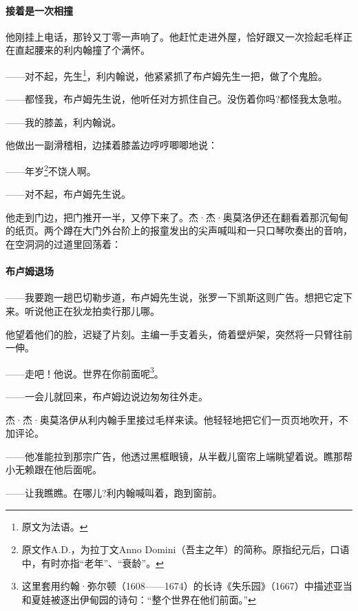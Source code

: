 \paragraph*{接着是一次相撞}
\par 他刚挂上电话，那铃又丁零一声响了。他赶忙走进外屋，恰好跟又一次捡起毛样正在直起腰来的利内翰撞了个满怀。
\par ——对不起，先生\footnote{原文为法语。}，利内翰说，他紧紧抓了布卢姆先生一把，做了个鬼脸。
\par ——都怪我，布卢姆先生说，他听任对方抓住自己。没伤着你吗?都怪我太急啦。
\par ——我的膝盖，利内翰说。
\par 他做出一副滑稽相，边揉着膝盖边哼哼唧唧地说：
\par ——年岁\footnote{原文作A.D.，为拉丁文Anno Domini（吾主之年）的简称。原指纪元后，口语中，有时亦指“老年”、“衰龄”。}不饶人啊。
\par ——对不起，布卢姆先生说。
\par 他走到门边，把门推开一半，又停下来了。杰·杰·奥莫洛伊还在翻看着那沉甸甸的纸页。两个蹲在大门外台阶上的报童发出的尖声喊叫和一只口琴吹奏出的音响，在空洞洞的过道里回荡着：

\paragraph*{布卢姆退场}
\par ——我要跑一趟巴切勒步道，布卢姆先生说，张罗一下凯斯这则广告。想把它定下来。听说他正在狄龙拍卖行那儿哪。
\par 他望着他们的脸，迟疑了片刻。主编一手支着头，倚着壁炉架，突然将一只臂往前一伸。
\par ——走吧！他说。世界在你前面呢\footnote{这里套用约翰·弥尔顿（1608——1674）的长诗《失乐园》（1667）中描述亚当和夏娃被逐出伊甸园的诗句：“整个世界在他们前面。”}。
\par ——一会儿就回来，布卢姆边说边匆匆往外走。
\par 杰·杰·奥莫洛伊从利内翰手里接过毛样来读。他轻轻地把它们一页页地吹开，不加评论。
\par ——他准能拉到那宗广告，他透过黑框眼镜，从半截儿窗帘上端眺望着说。瞧那帮小无赖跟在他后面呢。
\par ——让我瞧瞧。在哪儿?利内翰喊叫着，跑到窗前。
